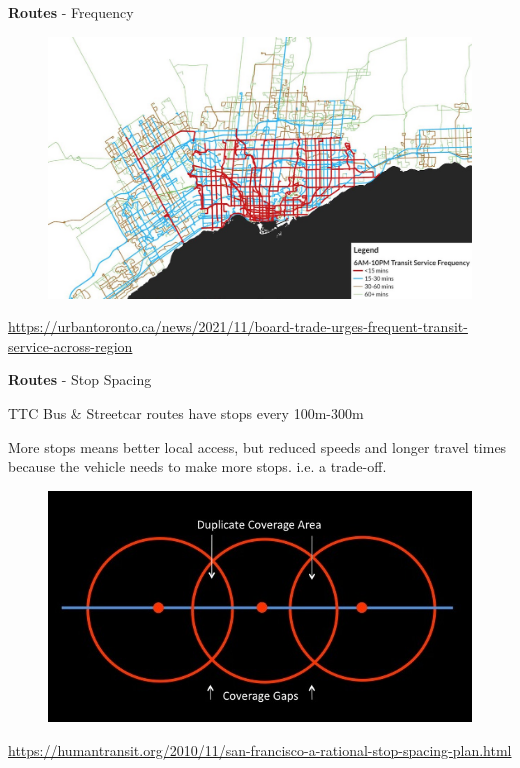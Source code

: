 \documentclass[aspectratio=169]{beamer}
\begin{document}
\begin{frame}
	
	\textbf{Routes} - Frequency
	
	\begin{figure}
		\centering
		\includegraphics[width=0.8\linewidth]{images/gta_frequency.jpg}
	\end{figure}

	\tiny\url{https://urbantoronto.ca/news/2021/11/board-trade-urges-frequent-transit-service-across-region}
	
\end{frame}




\begin{frame}
	
	\textbf{Routes} - Stop Spacing
	
	\vspace{2mm}
	
	TTC Bus \& Streetcar routes have stops every 100m-300m
		
	\vspace{2mm}
	
	More stops means better local access, but reduced speeds and longer travel times because the vehicle needs to make more stops. i.e. a trade-off.
	
	\begin{figure}
		\centering
		\includegraphics[width=0.6\linewidth]{images/stop_spacing.jpg}
	\end{figure}
	
	
	\tiny \url{https://humantransit.org/2010/11/san-francisco-a-rational-stop-spacing-plan.html}
	
\end{frame}
\end{document}
